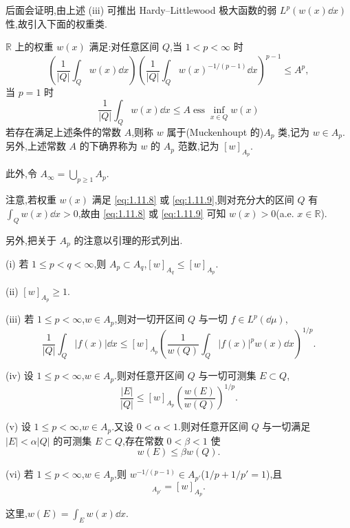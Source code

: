 后面会证明,由上述 (iii) 可推出 Hardy--Littlewood 极大函数的弱 $L^{p}(w(x)\dd x)$ 性,故引入下面的权重类.

\begin{definition}\label{def:1.11.2}
$\mathbb{R}$ 上的权重 $w(x)$ 满足:对任意区间 $Q$,当 $1 < p < \infty$ 时
\begin{equation}\tag{1.11.8}
\left(\frac{1}{|Q|}\int_{Q}w(x)\dd x\right)\left(\frac{1}{|Q|}\int_{Q}w(x)^{-1/(p-1)}\dd x\right)^{p-1} \leq A^{p},
\label{eq:1.11.8}\end{equation}
当 $p = 1$ 时
\begin{equation}\tag{1.11.9}
\frac{1}{|Q|}\int_{Q}w(x)\dd x \leq A\operatorname{ess}\inf_{x \in Q}w(x)
\label{eq:1.11.9}\end{equation}
若存在满足上述条件的常数 $A$,则称 $w$ 属于(Muckenhoupt 的)$A_{p}$ 类,记为 $w \in A_{p}$.另外,上述常数 $A$ 的下确界称为 $w$ 的 $A_{p}$ 范数,记为 $[w]_{A_{p}}$.

此外,令 $A_{\infty} = \bigcup_{p \geq 1}A_{p}$.
\end{definition}

注意,若权重 $w(x)$ 满足 \eqref{eq:1.11.8} 或 \eqref{eq:1.11.9},则对充分大的区间 $Q$ 有 $\int_{Q}w(x)\dd x > 0$,故由 \eqref{eq:1.11.8} 或 \eqref{eq:1.11.9} 可知 $w(x) > 0$(a.e. $x \in \mathbb{R}$).

另外,把关于 $A_{p}$ 的注意以引理的形式列出.

\begin{lemma}\label{lem:1.11.3}
(i) 若 $1 \leq p < q < \infty$,则 $A_{p} \subset A_{q}$,$[w]_{A_{q}} \leq [w]_{A_{p}}$.

(ii) $[w]_{A_{p}} \geq 1$.

(iii) 若 $1 \leq p < \infty$,$w \in A_{p}$,则对一切开区间 $Q$ 与一切 $f \in L^{p}(\dd\mu)$,
\begin{equation}\tag{1.11.10}
\frac{1}{|Q|}\int_{Q}|f(x)|\dd x \leq [w]_{A_{p}}\left(\frac{1}{w(Q)}\int_{Q}|f(x)|^{p}w(x)\dd x\right)^{1/p}.
\label{eq:1.11.10}\end{equation}

(iv) 设 $1 \leq p < \infty$,$w \in A_{p}$.则对任意开区间 $Q$ 与一切可测集 $E \subset Q$,
\begin{equation*}
\frac{|E|}{|Q|} \leq [w]_{A_{p}}\left(\frac{w(E)}{w(Q)}\right)^{1/p}.
\end{equation*}

(v) 设 $1 \leq p < \infty$,$w \in A_{p}$.又设 $0 < \alpha < 1$.则对任意开区间 $Q$ 与一切满足 $|E| < \alpha|Q|$ 的可测集 $E \subset Q$,存在常数 $0 < \beta < 1$ 使
\begin{equation*}
w(E) \leq \beta w(Q).
\end{equation*}

(vi) 若 $1 \leq p < \infty$,$w \in A_{p}$,则 $w^{-1/(p-1)} \in A_{p'}$($1/p + 1/p' = 1$),且
\begin{equation*}
[w^{-1/(p-1)}]_{A_{p'}} = [w]_{A_{p}}.
\end{equation*}

这里,$w(E) = \int_{E}w(x)\dd x$.
\end{lemma}

